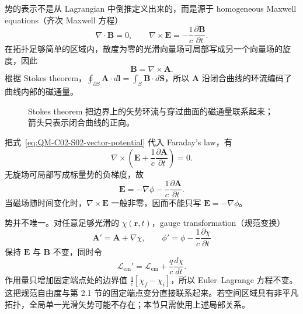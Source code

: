 势的表示不是从 Lagrangian 中倒推定义出来的，而是源于 homogeneous Maxwell equations（齐次 Maxwell 方程）
\begin{equation}
  \nabla\cdot\bm B=0,
  \qquad
  \nabla\times\bm E=-\frac1c\frac{\partial\bm B}{\partial t}.
  \label{eq:QM-C02-S02-homogeneous-maxwell}
\end{equation}
在拓扑足够简单的区域内，散度为零的光滑向量场可局部写成另一个向量场的旋度，因此
\begin{equation}
  \boxed{\bm B=\nabla\times\bm A.}
  \label{eq:QM-C02-S02-vector-potential}
\end{equation}
根据 Stokes theorem，$\oint_{\partial S}\bm A\cdot d\bm l=\int_S\bm B\cdot d\bm S$，所以 $\bm A$ 沿闭合曲线的环流编码了曲线内部的磁通量。
\begin{figure}[htbp]
  \centering
  \caption{Stokes theorem 把边界上的矢势环流与穿过曲面的磁通量联系起来；箭头只表示闭合曲线的正向。}
  \label{fig:QM-C02-S02-stokes}
\end{figure}
把式~\eqref{eq:QM-C02-S02-vector-potential} 代入 Faraday's law，有
\[
  \nabla\times\left(
    \bm E+\frac1c\frac{\partial\bm A}{\partial t}
  \right)=0.
\]
无旋场可局部写成标量势的负梯度，故
\begin{equation}
  \boxed{
  \bm E=-\nabla\phi-\frac1c\frac{\partial\bm A}{\partial t}.}
  \label{eq:QM-C02-S02-scalar-potential}
\end{equation}
当磁场随时间变化时，$\nabla\times\bm E$ 一般非零，因而不能只写 $\bm E=-\nabla\phi$。

势并不唯一。对任意足够光滑的 $\chi(\bm r,t)$，gauge transformation（规范变换）
\begin{equation}
  \bm A'=\bm A+\nabla\chi,
  \qquad
  \phi'=\phi-\frac1c\frac{\partial\chi}{\partial t}
  \label{eq:QM-C02-S02-gauge-transform}
\end{equation}
保持 $\bm E$ 与 $\bm B$ 不变，同时令
\begin{equation}
  \mathcal L_{\mathrm{em}}'
  =\mathcal L_{\mathrm{em}}+\frac qc\frac{d\chi}{dt}.
  \label{eq:QM-C02-S02-gauge-lagrangian}
\end{equation}
作用量只增加固定端点处的边界值 $\frac qc[\chi_f-\chi_i]$，所以 Euler--Lagrange 方程不变。这把规范自由度与第 2.1 节的固定端点变分直接联系起来。若空间区域具有非平凡拓扑，全局单一光滑矢势可能不存在；本节只需使用上述局部关系。

